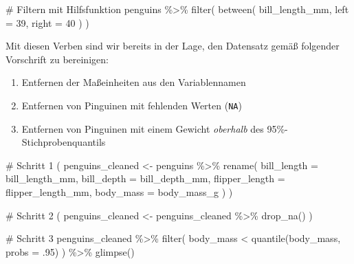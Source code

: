 \documentclass[
  a4paper,
  DIV=11,
  oneside]{scrreprt}
\newenvironment{Shaded}{\begin{snugshade}}{\end{snugshade}}
\newcommand{\NormalTok}[1]{\textcolor[rgb]{0.00,0.23,0.31}{#1}}
\providecommand{\tightlist}{%
  \setlength{\itemsep}{0pt}\setlength{\parskip}{0pt}}\usepackage{longtable,booktabs,array}
\begin{document}
\begin{Shaded}
\begin{Highlighting}[]
\NormalTok{\# Filtern mit Hilfsfunktion}
\NormalTok{penguins \%\textgreater{}\% }
\NormalTok{  filter(}
\NormalTok{    between(}
\NormalTok{      bill\_length\_mm, left = 39, right = 40}
\NormalTok{    )}
\NormalTok{  )}
\end{Highlighting}
\end{Shaded}

Mit diesen Verben sind wir bereits in der Lage, den Datensatz gemäß
folgender Vorschrift zu bereinigen:

\begin{enumerate}
\def\labelenumi{\arabic{enumi}.}
\tightlist
\item
  Entfernen der Maßeinheiten aus den Variablennamen
\item
  Entfernen von Pinguinen mit fehlenden Werten (\texttt{NA})
\item
  Entfernen von Pinguinen mit einem Gewicht \emph{oberhalb} des
  95\%-Stichprobenquantils
\end{enumerate}

\begin{Shaded}
\begin{Highlighting}[]
\NormalTok{\# Schritt 1}
\NormalTok{(}
\NormalTok{  penguins\_cleaned \textless{}{-} penguins \%\textgreater{}\% }
\NormalTok{    rename(}
\NormalTok{      bill\_length = bill\_length\_mm,}
\NormalTok{      bill\_depth  = bill\_depth\_mm,}
\NormalTok{      flipper\_length = flipper\_length\_mm,}
\NormalTok{      body\_mass = body\_mass\_g}
\NormalTok{    )}
\NormalTok{)}
\end{Highlighting}
\end{Shaded}

\begin{Shaded}
\begin{Highlighting}[]
\NormalTok{\# Schritt 2}
\NormalTok{(}
\NormalTok{  penguins\_cleaned \textless{}{-} penguins\_cleaned \%\textgreater{}\%}
\NormalTok{    drop\_na()}
\NormalTok{)}
\end{Highlighting}
\end{Shaded}

\begin{Shaded}
\begin{Highlighting}[]
\NormalTok{\# Schritt 3}
\NormalTok{penguins\_cleaned \%\textgreater{}\% }
\NormalTok{  filter(}
\NormalTok{    body\_mass \textless{} quantile(body\_mass, probs = .95)}
\NormalTok{  ) \%\textgreater{}\%}
\NormalTok{  glimpse()}
\end{Highlighting}
\end{Shaded}
\end{document}
